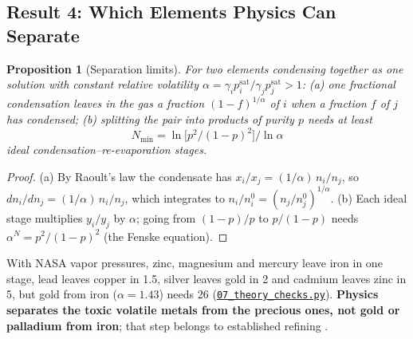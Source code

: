 \documentclass[11pt,a4paper]{article}
\newcommand{\gh}[2]{\href{https://github.com/syncaissa/paramanu-reclaimer/blob/main/#1}{\texttt{#2}}}
\theoremstyle{definition}
\theoremstyle{plain}
\newtheorem{proposition}{Proposition}[section]
\theoremstyle{remark}
\begin{document}
\subsection{Result 4: Which Elements Physics Can Separate}
\begin{proposition}[Separation limits]\label{prop:fenske}
For two elements condensing together as one solution with constant relative volatility $\alpha = \gamma_i p_i^{\mathrm{sat}}/\gamma_j p_j^{\mathrm{sat}} > 1$: (a) one fractional condensation leaves in the gas a fraction $(1-f)^{1/\alpha}$ of $i$ when a fraction $f$ of $j$ has condensed; (b) splitting the pair into products of purity $p$ needs at least
\begin{equation}\label{eq:fenske}
N_{\min} = \ln\!\big[p^2/(1-p)^2\big]\big/\ln\alpha
\end{equation}
ideal condensation--re-evaporation stages.
\end{proposition}
\begin{proof}
(a) By Raoult's law the condensate has $x_i/x_j = (1/\alpha)\,n_i/n_j$, so $dn_i/dn_j = (1/\alpha)\,n_i/n_j$, which integrates to $n_i/n_i^0 = (n_j/n_j^0)^{1/\alpha}$. (b) Each ideal stage multiplies $y_i/y_j$ by $\alpha$; going from $(1-p)/p$ to $p/(1-p)$ needs $\alpha^N = p^2/(1-p)^2$ (the Fenske equation).
\end{proof}
With NASA vapor pressures, zinc, magnesium and mercury leave iron in one stage, lead leaves copper in 1.5, silver leaves gold in 2 and cadmium leaves zinc in 5, but gold from iron ($\alpha = 1.43$) needs 26 (\gh{simulation/scripts/07_theory_checks.py}{07\_theory\_checks.py}). \textbf{Physics separates the toxic volatile metals from the precious ones, not gold or palladium from iron}; that step belongs to established refining \citep{cui2008}.
\end{document}

